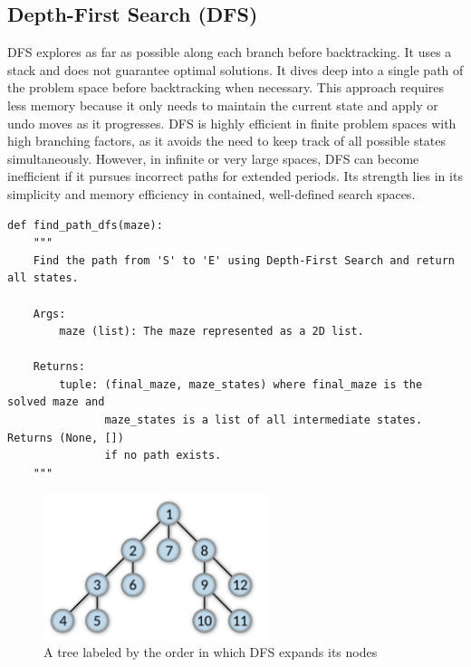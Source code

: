 \documentclass[final, journal, 11pt]{report}
\begin{document}
	\subsection*{Depth-First Search (DFS)}
	DFS explores as far as possible along each branch before backtracking. It uses a stack and does not guarantee optimal solutions. It dives deep into a single path of the problem space before backtracking when necessary. This approach requires less memory because it only needs to maintain the current state and apply or undo moves as it progresses. DFS is highly efficient in finite problem spaces with high branching factors, as it avoids the need to keep track of all possible states simultaneously. However, in infinite or very large spaces, DFS can become inefficient if it pursues incorrect paths for extended periods. Its strength lies in its simplicity and memory efficiency in contained, well-defined search spaces.
	

	
	\begin{lstlisting}
def find_path_dfs(maze):
    """
    Find the path from 'S' to 'E' using Depth-First Search and return all states.

    Args:
        maze (list): The maze represented as a 2D list.

    Returns:
        tuple: (final_maze, maze_states) where final_maze is the solved maze and 
               maze_states is a list of all intermediate states. Returns (None, [])
               if no path exists.
    """
	\end{lstlisting}
	
	\begin{figure}[!htbp]
		\centering
		\includegraphics[width=2.6in]{assets/DFS.png}
		\caption{A tree labeled by the order in which DFS expands its nodes}
		\label{fig:DFS}
	\end{figure} 
	
\end{document}
